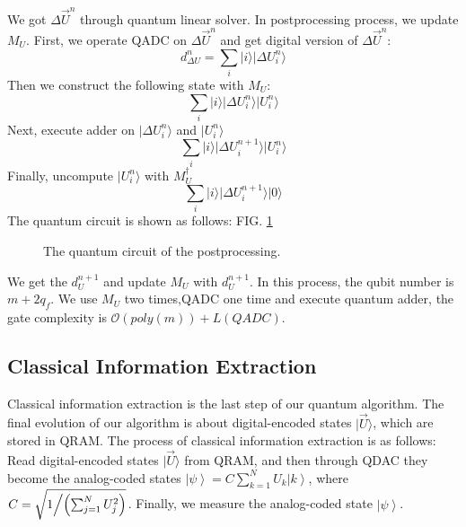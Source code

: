 \documentclass[%
 reprint,
 amsmath,amssymb,
pra,
]{revtex4-1}
\begin{document}
We got $\Delta \vec{U}^n$ through quantum linear solver. In postprocessing process, we update $M_U$. First, we operate QADC on $\Delta \vec{U}^n$ and get digital version of $\Delta \vec{U}^n$:
\begin{equation}
d_{\Delta U}^n=\sum_i{|i\rangle|\Delta U_i^n\rangle}
\end{equation}
Then we construct the following state with $M_U$:
\begin{equation}
\sum_i{|i\rangle|\Delta U_i^n\rangle|U_i^n\rangle}
\end{equation}
Next, execute adder on $|\Delta U_i^n\rangle$ and $|U_i^n\rangle$
\begin{equation}
\sum_i{|i\rangle|\Delta U_i^{n+1}\rangle|U_i^n\rangle}
\end{equation}
Finally, uncompute $|U_i^n\rangle$ with $M_U^{\dagger}$
\begin{equation}
\sum_i{|i\rangle|\Delta U_i^{n+1}\rangle|0\rangle}
\end{equation}
The quantum circuit is shown as follows: FIG. \ref{postprocessing_qcir}
\begin{figure}[htbp]
	 \caption{The quantum circuit of the postprocessing.}
	\label{postprocessing_qcir}
   \end{figure}
We get the $d_U^{n+1}$ and update $M_U$ with $d_U^{n+1}$. In this process, the qubit number is $m+2q_f$. We use $M_U$ two times,QADC one time and execute quantum adder, the gate complexity is $\mathcal{O}(poly(m))+L(QADC)$.


\subsection{Classical Information Extraction}
Classical information extraction is the last step of our quantum algorithm. The final evolution of our algorithm is about digital-encoded states $|\vec{U}\rangle$, which are stored in QRAM. The process of classical information extraction is as follows: Read digital-encoded states $|\vec{U}\rangle$ from QRAM, and then through QDAC they become the analog-coded states $\left| \psi \right\rangle = C\sum\limits_{k = 1}^N {{U_k}\left| k \right\rangle}$, where $C = \sqrt{{1 \mathord{\left/{\vphantom {1 {\left( {\sum\nolimits_{j = 1}^N {U_j^2} } \right)}}} \right. \kern-\nulldelimiterspace}{\left( {\sum\nolimits_{j = 1}^N {U_j^2} } \right)}}}$. Finally, we measure the analog-coded state $\left| \psi \right\rangle $.
\end{document}
